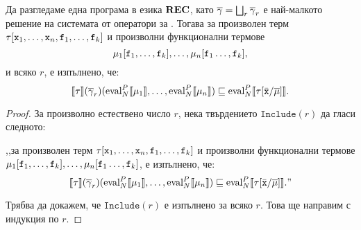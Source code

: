 \begin{prop}
  \label{pr:op-name-inclusion2}
  Да разгледаме една програма  в езика ${\bf REC}$, като
  $\overline{\gamma} = \bigsqcup_r\overline{\gamma}_r$ е най-малкото решение на системата от оператори за .
  Тогава за произволен терм $\tau[\texttt{x}_1,\dots,\texttt{x}_n,\texttt{f}_1,\dots,\texttt{f}_k]$ и
  произволни функционални термове
  \[\mu_1[\texttt{f}_1,\dots,\texttt{f}_k],\dots,\mu_n[\texttt{f}_1\dots,\texttt{f}_k],\]
  и всяко $r$, е изпълнено, че:
  \[\llbracket{\tau}\rrbracket(\overline{\gamma}_r)(\text{eval}^P_N\llbracket{{\mu_1}}\rrbracket,\dots,\text{eval}^P_N\llbracket{{\mu_n}}\rrbracket) \sqsubseteq \text{eval}^P_N\llbracket{{\tau[\bar{\texttt{x}}/\overline{\mu}]}}\rrbracket.\]
\end{prop}
\begin{proof}
  За произволно естествено число $r$, нека твърдението $\texttt{Include}(r)$ да гласи следното:

  ,,за произволен терм $\tau[\texttt{x}_1,\dots,\texttt{x}_n,\texttt{f}_1,\dots,\texttt{f}_k]$ и
  произволни функционални термове $\mu_1[\texttt{f}_1,\dots,\texttt{f}_k],\dots,\mu_n[\texttt{f}_1\dots,\texttt{f}_k]$,
  е изпълнено, че:
  \[\llbracket{\tau}\rrbracket(\overline{\gamma}_r)(\text{eval}^P_N\llbracket{{\mu_1}}\rrbracket,\dots,\text{eval}^P_N\llbracket{{\mu_n}}\rrbracket) \sqsubseteq \text{eval}^P_N\llbracket{{\tau[\bar{\texttt{x}}/\overline{\mu}]}}\rrbracket.\text{''}\]
  
  Трябва да докажем, че $\texttt{Include}(r)$ е изпълнено за всяко $r$.
  Това ще направим с индукция по $r$.


\end{proof}
